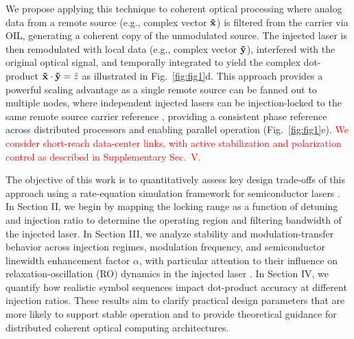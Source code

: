 \documentclass[%
 aip,
 apl,
 amsmath,amssymb,
 reprint,%
 floatfix,
]{revtex4-1}
\newcommand{\reviewreplace}[2]{\textcolor{red}{#2}}
\begin{document}
We propose applying this technique to coherent optical processing \cite{Zhou2025_QA_PhotonicHomodyne} where analog data from a remote source (e.g., complex vector $\bf \tilde{x}$) is filtered from the carrier via OIL, generating a coherent copy of the unmodulated source. The injected laser is then remodulated with local data (e.g., complex vector $\bf \tilde{y}$), interfered with the original optical signal, and temporally integrated to yield the complex dot-product ${\bf\tilde{x}} \cdot {\bf\tilde{y}} = \tilde{z}$ as illustrated in Fig.~\ref{fig:fig1}d. This approach provides a powerful scaling advantage as a single remote source can be fanned out to multiple nodes, where independent injected lasers can be injection-locked to the same remote source carrier reference \cite{LiuSlavik2020OILTutorial}, providing a consistent phase reference across distributed processors and enabling parallel operation (Fig.~\ref{fig:fig1}e). \reviewreplace{Notably, this approach allows independent tracking of phase and frequency variations across the network without the need for multiple active control loops, provided polarization is maintained or tracked and phase variations are within the bandwidth of the locking range.}{We consider short-reach data-center links, with active stabilization and polarization control as described in Supplementary Sec.~V.}

The objective of this work is to quantitatively assess key design trade-offs of this approach using a rate-equation simulation framework for semiconductor lasers \cite{Lang1982InjectionLockingProperties,WieczorekKrauskopfLenstra1999Bifurcations}. In Section II, we begin by mapping the locking range as a function of detuning and injection ratio to determine the operating region and filtering bandwidth of the injected laser. In Section III,  we analyze stability and modulation-transfer behavior across injection regimes, modulation frequency, and semiconductor linewidth enhancement factor $\alpha$, with particular attention to their influence on relaxation-oscillation (RO) dynamics in the injected laser \cite{Lau2008JQE_FreqRespEnh_OIL,WieczorekKrauskopfLenstra1999Bifurcations,LIN14}. In Section IV, we quantify how realistic symbol sequences impact dot-product accuracy at different injection ratios. These results aim to clarify practical design parameters that are more likely to support stable operation and to provide theoretical guidance for distributed coherent optical computing architectures.

\end{document}
